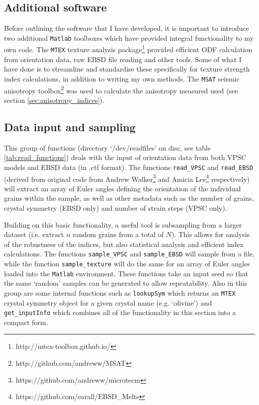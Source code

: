 \documentclass[a4paper,12pt,twoside]{report}
\numberwithin{equation}{chapter}
\begin{document}
\subsection{Additional software}
Before outlining the software that I have developed, it is important to introduce two additional \texttt{Matlab} toolboxes which have provided integral functionality to my own code. The \texttt{MTEX} texture analysis package\footnote{http://mtex-toolbox.github.io/} \citep{Bachmann2010,Mainprice} provided efficient ODF calculation from orientation data, raw EBSD file reading and other tools. Some of what I have done is to streamline and standardise these specifically for texture strength index calculations, in addition to writing my own methods. The \texttt{MSAT} seismic anisotropy toolbox\footnote{http://github.com/andreww/MSAT} \citep{Walker} was used to calculate the anisotropy measured used (see section \ref{sec:anisotropy_indices}).    

\subsection{Data input and sampling}

This group of functions (directory \lq{}/dev/readfiles\rq{} on disc, see table \ref{tab:read_functions}) deals with the input of orientation data from both VPSC models and EBSD data (in .ctf format). The functions \texttt{read\_{}VPSC} and \texttt{read\_{}EBSD} (derived from original code from  Andrew Walker\footnote{https://github.com/andreww/microtecm} and Amicia Lee\footnote{https://github.com/earall/EBSD\_{}Melts} respectively) will extract an array of Euler angles defining the orientation of the individual grains within the sample, as well as other metadata such as the number of grains, crystal symmetry (EBSD only) and number of strain steps (VPSC only).                                                

Building on this basic functionality, a useful tool is subsampling from a larger dataset (i.e. extract $n$ random grains from a total of $N$). This allows for analysis of the robustness of the indices, but also statistical analysis and efficient index calculations. The functions \texttt{sample\_{}VPSC} and \texttt{sample\_{}EBSD} will sample from a file, while the function \texttt{sample\_{}texture} will do the same for an array of Euler angles loaded into the \texttt{Matlab} environment. These functions take an input seed so that the same \lq{}random\rq{} samples can be generated to allow repeatability. Also in this group are some internal functions such as \texttt{lookupSym} which returns an \texttt{MTEX} crystal symmetry object \citep{Bachmann2010} for a given crystal name (e.g. \lq{}olivine\rq{}) and \texttt{get\_{}inputInfo} which combines all of the functionality in this section into a compact form.                                                                                                                            
\end{document}
